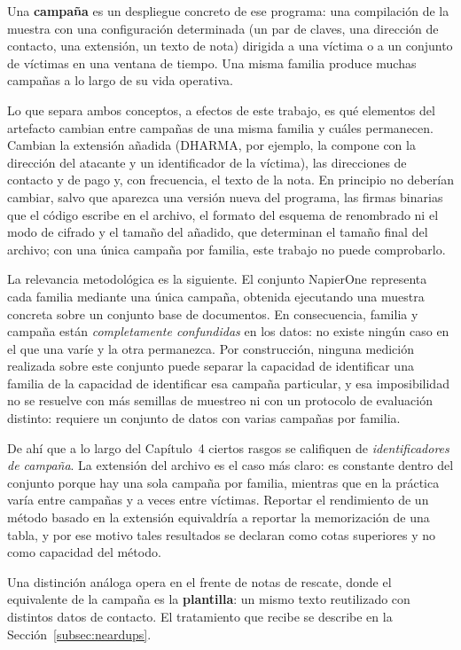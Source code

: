 Una \textbf{campaña} es un despliegue concreto de ese programa: una compilación de la muestra con una configuración determinada (un par de claves, una dirección de contacto, una extensión, un texto de nota) dirigida a una víctima o a un conjunto de víctimas en una ventana de tiempo. Una misma familia produce muchas campañas a lo largo de su vida operativa.

Lo que separa ambos conceptos, a efectos de este trabajo, es qué elementos del artefacto cambian entre campañas de una misma familia y cuáles permanecen. Cambian la extensión añadida (DHARMA, por ejemplo, la compone con la dirección del atacante y un identificador de la víctima), las direcciones de contacto y de pago y, con frecuencia, el texto de la nota. En principio no deberían cambiar, salvo que aparezca una versión nueva del programa, las firmas binarias que el código escribe en el archivo, el formato del esquema de renombrado ni el modo de cifrado y el tamaño del añadido, que determinan el tamaño final del archivo; con una única campaña por familia, este trabajo no puede comprobarlo.

La relevancia metodológica es la siguiente. El conjunto NapierOne representa cada familia mediante una única campaña, obtenida ejecutando una muestra concreta sobre un conjunto base de documentos. En consecuencia, familia y campaña están \textit{completamente confundidas} en los datos: no existe ningún caso en el que una varíe y la otra permanezca. Por construcción, ninguna medición realizada sobre este conjunto puede separar la capacidad de identificar una familia de la capacidad de identificar esa campaña particular, y esa imposibilidad no se resuelve con más semillas de muestreo ni con un protocolo de evaluación distinto: requiere un conjunto de datos con varias campañas por familia.

De ahí que a lo largo del Capítulo~4 ciertos rasgos se califiquen de \textit{identificadores de campaña}. La extensión del archivo es el caso más claro: es constante dentro del conjunto porque hay una sola campaña por familia, mientras que en la práctica varía entre campañas y a veces entre víctimas. Reportar el rendimiento de un método basado en la extensión equivaldría a reportar la memorización de una tabla, y por ese motivo tales resultados se declaran como cotas superiores y no como capacidad del método.

Una distinción análoga opera en el frente de notas de rescate, donde el equivalente de la campaña es la \textbf{plantilla}: un mismo texto reutilizado con distintos datos de contacto. El tratamiento que recibe se describe en la Sección~\ref{subsec:neardups}.

